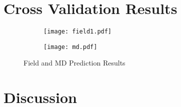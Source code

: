 \section{Cross Validation Results}

\begin{figure}[p]
	\centering
	\begin{subfigure}[b]{\textwidth}
		\centering
		\texttt{[image: field1.pdf]}
		\caption{}
	\end{subfigure}
	\hfill
	\begin{subfigure}[b]{\textwidth}
		\centering
		\texttt{[image: md.pdf]}
		\caption{}
	\end{subfigure}
	\caption[Field and \acs{MD} Prediction Results]{Field and \ac{MD} Prediction Results}
\end{figure}

\section{Discussion}



